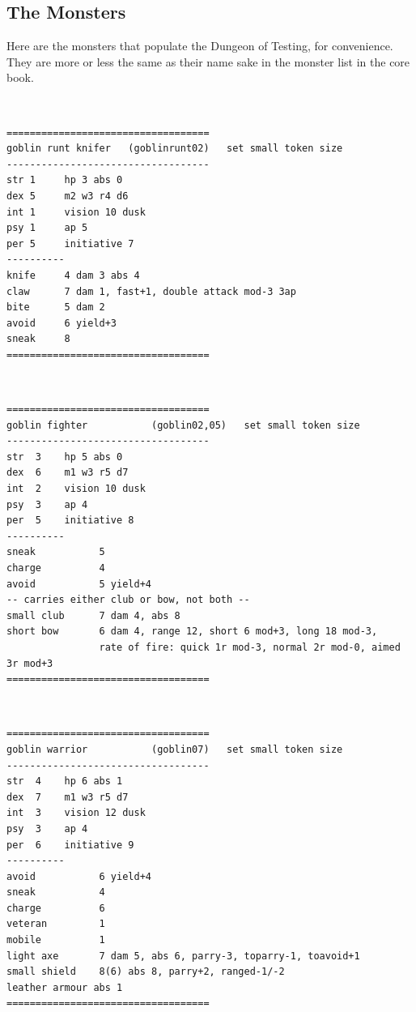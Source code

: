 


\subsection*{The Monsters}

Here are the monsters that populate the Dungeon of Testing, for convenience. They are more or less the same as their name sake in the monster list in the core book.

\

\goodbreak \begin{samepage} \small \begin{verbatim}
===================================
goblin runt knifer   (goblinrunt02)   set small token size
-----------------------------------
str 1     hp 3 abs 0
dex 5     m2 w3 r4 d6
int 1     vision 10 dusk
psy 1     ap 5
per 5     initiative 7
----------
knife     4 dam 3 abs 4
claw      7 dam 1, fast+1, double attack mod-3 3ap
bite      5 dam 2
avoid     6 yield+3
sneak     8
===================================
\end{verbatim} \normalsize \end{samepage}

\

\goodbreak \begin{samepage} \small \begin{verbatim}
===================================
goblin fighter           (goblin02,05)   set small token size
-----------------------------------
str  3    hp 5 abs 0
dex  6    m1 w3 r5 d7
int  2    vision 10 dusk
psy  3    ap 4
per  5    initiative 8
----------
sneak           5
charge          4
avoid           5 yield+4
-- carries either club or bow, not both --
small club      7 dam 4, abs 8
short bow       6 dam 4, range 12, short 6 mod+3, long 18 mod-3,
                rate of fire: quick 1r mod-3, normal 2r mod-0, aimed 3r mod+3
===================================
\end{verbatim} \normalsize \end{samepage}

\

\goodbreak \begin{samepage} \small \begin{verbatim}
===================================
goblin warrior           (goblin07)   set small token size
-----------------------------------
str  4    hp 6 abs 1
dex  7    m1 w3 r5 d7
int  3    vision 12 dusk
psy  3    ap 4
per  6    initiative 9
----------
avoid           6 yield+4
sneak           4
charge          6
veteran         1
mobile          1
light axe       7 dam 5, abs 6, parry-3, toparry-1, toavoid+1
small shield    8(6) abs 8, parry+2, ranged-1/-2
leather armour abs 1
===================================
\end{verbatim} \normalsize \end{samepage}

